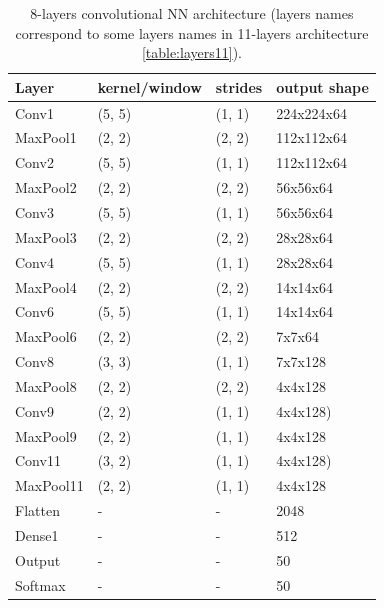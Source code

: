 \documentclass[a4paper]{article}
\begin{document}
\begin{table}[!h]
    \caption{ 8-layers convolutional NN architecture (layers names correspond to some layers names in 11-layers architecture \ref{table:layers11}).
    \label{table:layers8}
    }
\begin{center}
    \begin{tabular}{| l | l | l | l |}
    \hline
        Layer & kernel/window& strides & output shape\\
    \hline
        Conv1  & (5, 5)&        (1, 1)&     224x224x64  \\
    \hline
        MaxPool1 & (2, 2)&      (2, 2)&     112x112x64  \\
        Conv2  & (5, 5)&        (1, 1)&     112x112x64  \\
    \hline
        MaxPool2 & (2, 2)&      (2, 2)&     56x56x64    \\
        Conv3  & (5, 5)&        (1, 1)&     56x56x64    \\
    \hline
        MaxPool3 & (2, 2)&      (2, 2)&     28x28x64    \\
        Conv4  & (5, 5)&        (1, 1)&     28x28x64  \\
    \hline
        MaxPool4 & (2, 2)&      (2, 2)&     14x14x64  \\
        Conv6  & (5, 5)&        (1, 1)&     14x14x64  \\
    \hline
        MaxPool6 & (2, 2)&      (2, 2)&     7x7x64  \\
        Conv8  & (3, 3)&        (1, 1)&     7x7x128\\
    \hline
        MaxPool8 & (2, 2)&      (2, 2)&     4x4x128  \\
        Conv9  & (2, 2)&        (1, 1)&     4x4x128)\\
    \hline
        MaxPool9 & (2, 2)&      (1, 1)&     4x4x128  \\
        Conv11 & (3, 2)&        (1, 1)&     4x4x128)\\  %
    \hline
        MaxPool11 & (2, 2)&      (1, 1)&     4x4x128  \\
        Flatten & - & - & 2048 \\
        Dense1 & - & - & 512 \\
    \hline
        Output & - & - & 50 \\
        Softmax & - & - & 50 \\
    \hline
    \end{tabular}
\end{center}
\end{table}
\end{document}
